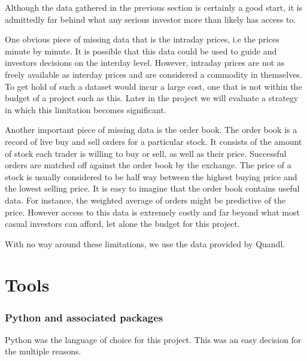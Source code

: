 \documentclass{report}
\begin{document}
Although the data gathered in the previous section is certainly a good start, it is admittedly far behind what any serious investor more than likely has access to. 

One obvious piece of missing data that is the intraday prices, i.e the prices minute by minute. It is possible that this data could be used to guide and investors decisions on the interday level. However, intraday prices are not as freely available as interday prices and are considered a commodity in themselves. To get hold of such a dataset would incur a large cost, one that is not within the budget of a project such as this. Later in the project we will evaluate a strategy in which this limitation becomes significant.

Another important piece of missing data is the order book. The order book is a record of live buy and sell orders for a particular stock. It consists of the amount of stock each trader is willing to buy or sell, as well as their price. Successful orders are matched off against the order book by the exchange. The price of a stock is usually considered to be half way between the highest buying price and the lowest selling price. It is easy to imagine that the order book contains useful data. For instance, the weighted average of orders might be predictive of the price. However access to this data is extremely costly and far beyond what most casual investors can afford, let alone the budget for this project.

With no way around these limitations, we use the data provided by Quandl.

\section{Tools}
\subsubsection{Python and associated packages}

Python was the language of choice for this project. This was an easy decision for the multiple reasons.
\end{document}
